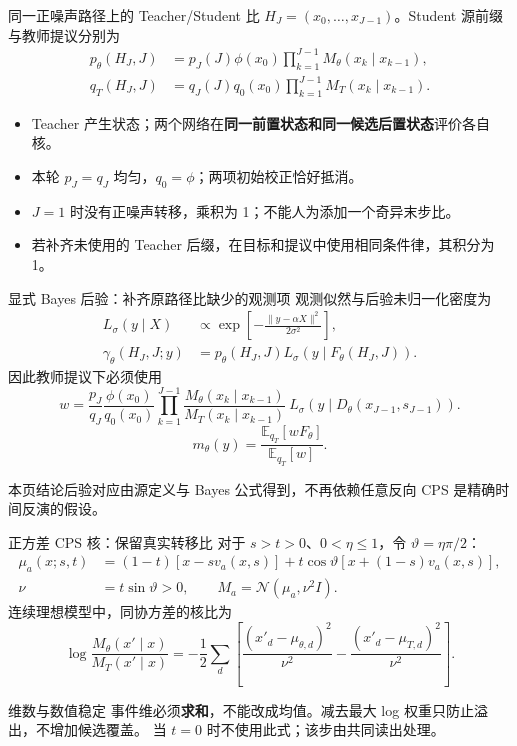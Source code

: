 \documentclass[10pt,aspectratio=169]{beamer}
\newcommand{\E}{\mathbb E}
\newcommand{\N}{\mathcal N}
\newcommand{\takeaway}[1]{\begin{exampleblock}{本页结论}\small #1\end{exampleblock}}
\begin{document}
\begin{frame}{同一正噪声路径上的 Teacher/Student 比}
\small
$H_J=(x_0,\ldots,x_{J-1})$。Student 源前缀与教师提议分别为
\begin{align}
p_\theta(H_J,J)&=p_J(J)\phi(x_0)\prod_{k=1}^{J-1}M_\theta(x_k\mid x_{k-1}),\\
q_T(H_J,J)&=q_J(J)q_0(x_0)\prod_{k=1}^{J-1}M_T(x_k\mid x_{k-1}).
\end{align}
\begin{itemize}\itemsep5pt
\item Teacher 产生状态；两个网络在\textbf{同一前置状态和同一候选后置状态}评价各自核。
\item 本轮 $p_J=q_J$ 均匀，$q_0=\phi$；两项初始校正恰好抵消。
\item $J=1$ 时没有正噪声转移，乘积为 1；不能人为添加一个奇异末步比。
\item 若补齐未使用的 Teacher 后缀，在目标和提议中使用相同条件律，其积分为 1。
\end{itemize}
\end{frame}

\begin{frame}{显式 Bayes 后验：补齐原路径比缺少的观测项}
\small
观测似然与后验未归一化密度为
\begin{align}
L_\sigma(y\mid X)&\propto\exp\!\left[-\frac{\|y-\alpha X\|^2}{2\sigma^2}\right],\\
\gamma_\theta(H_J,J;y)&=p_\theta(H_J,J)L_\sigma(y\mid F_\theta(H_J,J)).
\end{align}
因此教师提议下必须使用
\begin{equation}\label{eq:weight}
\boxed{w=\frac{p_J}{q_J}\frac{\phi(x_0)}{q_0(x_0)}
\prod_{k=1}^{J-1}\frac{M_\theta(x_k\mid x_{k-1})}{M_T(x_k\mid x_{k-1})}
\ L_\sigma(y\mid D_\theta(x_{J-1},s_{J-1})).}
\end{equation}
\begin{equation}\label{eq:posterior}
m_\theta(y)=\frac{\E_{q_T}[w F_\theta]}{\E_{q_T}[w]}.
\end{equation}
\takeaway{后验对应由源定义与 Bayes 公式得到，不再依赖任意反向 CPS 是精确时间反演的假设。}
\end{frame}

\begin{frame}{正方差 CPS 核：保留真实转移比}
\small
对于 $s>t>0$、$0<\eta\leq1$，令 $\vartheta=\eta\pi/2$：
\begin{align}
\mu_a(x;s,t)&=(1-t)[x-sv_a(x,s)]+t\cos\vartheta[x+(1-s)v_a(x,s)],\\
\nu&=t\sin\vartheta>0,\qquad M_a=\N(\mu_a,\nu^2I).
\end{align}
连续理想模型中，同协方差的核比为
\begin{equation}
\log\frac{M_\theta(x'\mid x)}{M_T(x'\mid x)}
=-\frac12\sum_d\left[\frac{(x'_d-\mu_{\theta,d})^2}{\nu^2}
-\frac{(x'_d-\mu_{T,d})^2}{\nu^2}\right].
\end{equation}
\begin{alertblock}{维数与数值稳定}
事件维必须\textbf{求和}，不能改成均值。减去最大 log 权重只防止溢出，不增加候选覆盖。
当 $t=0$ 时不使用此式；该步由共同读出处理。
\end{alertblock}
\end{frame}
\end{document}
